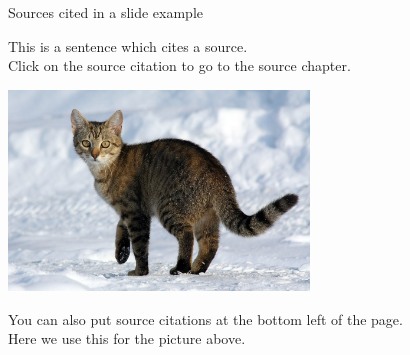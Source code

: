 \begin{frame}{Sources cited in a slide example}

  This is a sentence which cites a source. \cite{Ahlswede2000-1} \\
  Click on the source citation to go to the source chapter.

  \vspace{0.3cm}

  \includegraphics[width=0.6\textwidth]{images/cat-2.jpg}
  
  \vspace{0.3cm}
  
  You can also put source citations at the bottom left of the page. \\
  Here we use this for the picture above.

		
\end{frame}
